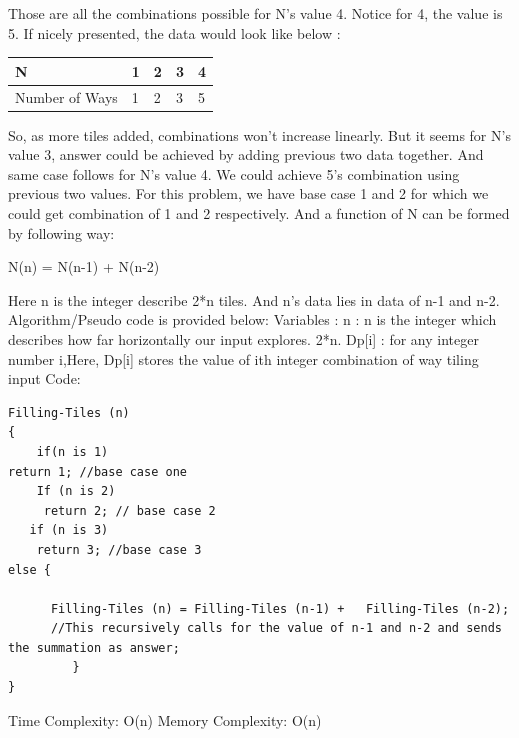 \documentclass[12pt]{article}
\begin{document}
{\begin{itemize}
\end{itemize}
Those are all the combinations possible for N’s value 4. Notice for 4, the value is 5. If nicely presented, the data would look like below :
\begin{center}
\begin{tabu} to 0.8\textwidth { | X[2] | X[.8] | X[.8] | X[.8]|X[.8]|}
 \hline
 N&1&2&3&4\\
 \hline
 Number of Ways&1&2&3&5  \\
\hline
\end{tabu}
\end{center}
So, as more tiles added, combinations won’t increase linearly. But it seems for N’s value 3, answer could be achieved by adding previous two data together. And same case follows for N’s value 4. We could achieve 5’s combination using previous two values. 
\newline
For this problem, we have base case 1 and 2 for which we could get combination of 1 and 2 respectively. And a function of N can be formed by following way:
\newline
\begin{center}
N(n) = N(n-1) + N(n-2)
\end{center}
Here n is the integer describe 2*n tiles. And n’s data lies in data of n-1 and n-2.
\newline
Algorithm/Pseudo code is provided below: 
\newline
Variables : \newline
n : n is the integer which describes how far horizontally our input explores. 2*n.\newline
Dp[i] : for any integer number i,\vspace{3mm}\newline Here, Dp[i] stores the value of ith integer combination of way tiling input \vspace{3mm}
\newline
Code: \vspace{3mm}
\begin{lstlisting}
Filling-Tiles (n)
{
    if(n is 1)
return 1; //base case one
    If (n is 2)
   	 return 2; // base case 2
   if (n is 3)
	return 3; //base case 3
else {

  	  Filling-Tiles (n) = Filling-Tiles (n-1) +   Filling-Tiles (n-2);
  	  //This recursively calls for the value of n-1 and n-2 and sends the summation as answer;
         }
}
\end{lstlisting}
Time Complexity: O(n)
\newline
Memory Complexity: O(n)
\newline
\vspace{6mm}
}
\end{document}
